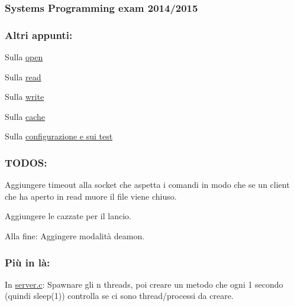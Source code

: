 \subsubsection*{Systems Programming exam 2014/2015}

\subsubsection*{Altri appunti\+:}


\begin{DoxyItemize}
\item Sulla \hyperlink{md_OPE}{open}
\item Sulla \hyperlink{md_READ}{read}
\item Sulla \hyperlink{md_WRITE}{write}
\item Sulla \hyperlink{md_Cache}{cache}
\item Sulla \hyperlink{md_Test}{configurazione e sui test}
\end{DoxyItemize}

\subsubsection*{T\+O\+D\+O\+S\+:}


\begin{DoxyItemize}
\item Aggiungere timeout alla socket che aspetta i comandi in modo che se un client che ha aperto in read muore il file viene chiuso.
\item Aggiungere le cazzate per il lancio.
\item Alla fine\+: Aggingere modalità deamon.
\end{DoxyItemize}

\subsubsection*{Più in là\+:}


\begin{DoxyItemize}
\item In \hyperlink{server_8c}{server.\+c}\+: Spawnare gli n threads, poi creare un metodo che ogni 1 secondo (quindi sleep(1)) controlla se ci sono thread/processi da creare. 
\end{DoxyItemize}